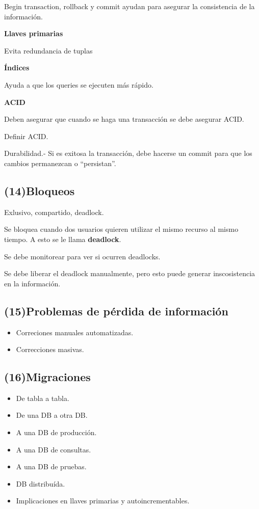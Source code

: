 \documentclass{article}
\begin{document}
Begin transaction, rollback y commit ayudan para asegurar la consistencia de la
información.
\vspace{1em}

\textbf{Llaves primarias}

Evita redundancia de tuplas
\vspace{1em}

\textbf{Índices}

Ayuda a que los queries se ejecuten más rápido.
\vspace{1em}

\textbf{ACID}

Deben asegurar que cuando se haga una transacción se debe asegurar ACID.

Definir ACID.

Durabilidad.- Si es exitosa la transacción, debe hacerse un commit para que los
cambios permanezcan o ``persistan''.

\subsection{(14)Bloqueos}

Exlusivo, compartido, deadlock.

Se bloquea cuando dos usuarios quieren utilizar el mismo recurso al mismo
tiempo. A esto se le llama \textbf{deadlock}.

Se debe monitorear para ver si ocurren deadlocks.

Se debe liberar el deadlock manualmente, pero esto puede generar inscosistencia
en la información.

\subsection{(15)Problemas de pérdida de información}

\begin{itemize}
	\item
	Correciones manuales automatizadas.
	\item
	Correcciones masivas.
\end{itemize}

\subsection{(16)Migraciones}

\begin{itemize}
	\item
	De tabla a tabla.
	\item
	De una DB a otra DB.
	\item
	A una DB de producción.
	\item
	A una DB de consultas.
	\item
	A una DB de pruebas.
	\item
	DB distribuída.
	\item
	Implicaciones en llaves primarias y autoincrementables.
\end{itemize}
\end{document}
